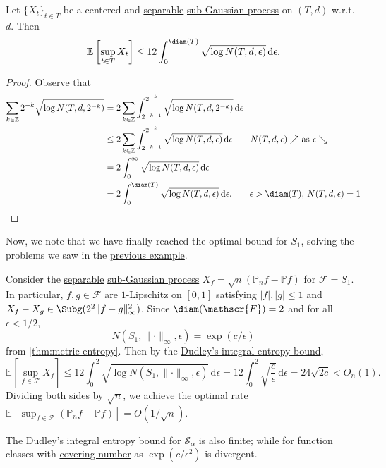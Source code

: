 \begin{corollary}\label{col:Dudley-integral-entropy-bound}
	Let \(\{ X_t \} _{t\in T}\) be a centered and \hyperref[def:separable]{separable} \hyperref[def:sub-Gaussian-process]{sub-Gaussian process} on \((T, d)\) w.r.t.\ \(d\). Then
	\[
		\mathbb{E}_{}\left[\sup _{t\in T} X_t \right] \leq 12 \int_{0}^{\diam(T) }\sqrt{\log N(T, d, \epsilon )} \,\mathrm{d}\epsilon.
	\]
\end{corollary}
\begin{proof}
	Observe that
	\begin{align*}
		\sum_{k\in \mathbb{Z} } 2^{-k} \sqrt{\log N(T, d, 2^{-k})}
		 & = 2 \sum_{k\in \mathbb{Z} } \int_{2^{-k-1}}^{2^{-k}} \sqrt{\log N(T, d, 2^{-k})}  \,\mathrm{d} \epsilon                                                                        \\
		 & \leq 2 \sum_{k\in \mathbb{Z} } \int_{2^{-k-1}}^{2^{-k}} \sqrt{\log N(T, d, \epsilon )} \,\mathrm{d} \epsilon \tag*{\(N(T, d, \epsilon ) \nearrow \) as \(\epsilon \searrow \)} \\
		 & = 2 \int_{0}^{\infty} \sqrt{\log N(T, d, \epsilon )} \,\mathrm{d}\epsilon                                                                                                      \\
		 & = 2 \int_{0}^{\diam(T) } \sqrt{\log N(T, d, \epsilon )} \,\mathrm{d}\epsilon. \tag*{\(\epsilon > \diam(T) \), \(N(T, d, \epsilon ) = 1\)}
	\end{align*}
\end{proof}

Now, we note that we have finally reached the optimal bound for \(S_1\), solving the problems we saw in the \hyperref[eg:non-optimal-EP-supremum-S1]{previous example}.

\begin{eg}\label{eg:optimal-EP-supremum-S1}
	Consider the \hyperref[def:separable]{separable} \hyperref[def:sub-Gaussian-process]{sub-Gaussian process} \(X_f = \sqrt{n} (\mathbb{P} _n f - \mathbb{P} f)\) for \(\mathscr{F} = S_1\). In particular, \(f, g\in \mathscr{F} \) are \(1\)-Lipschitz on \([0, 1]\) satisfying \(\vert f \vert , \vert g \vert \leq 1\) and \(X_f - X_g\in \Subg(2^2 \lVert f - g \rVert ^2_\infty )\). Since \(\diam(\mathscr{F} ) = 2 \) and for all \(\epsilon < 1 / 2\),
	\[
		N(S_1, \lVert \cdot \rVert _\infty , \epsilon ) = \exp (c / \epsilon )
	\]
	from \autoref{thm:metric-entropy}. Then by the \hyperref[col:Dudley-integral-entropy-bound]{Dudley's integral entropy bound},
	\[
		\mathbb{E}_{}\left[\sup _{f\in \mathscr{F} } X_f \right]
		\leq 12\int_{0}^{2} \sqrt{\log N(S_1, \lVert \cdot \rVert _\infty , \epsilon )} \,\mathrm{d}\epsilon
		= 12 \int_{0}^{2} \sqrt{\frac{c}{\epsilon }} \,\mathrm{d}\epsilon
		= 24 \sqrt{2c}
		< O_n(1).
	\]
	Dividing both sides by \(\sqrt{n} \), we achieve the optimal rate \(\mathbb{E}_{}\left[\sup _{f\in \mathscr{F} } (\mathbb{P} _n f - \mathbb{P} f) \right] = O(1 / \sqrt{n} )\).
\end{eg}

\begin{remark}
	The \hyperref[col:Dudley-integral-entropy-bound]{Dudley's integral entropy bound} for \(\mathcal{S} _\alpha \) is also finite; while for function classes with \hyperref[def:covering-number]{covering number} as \(\exp (c / \epsilon ^2)\) is divergent.
\end{remark}